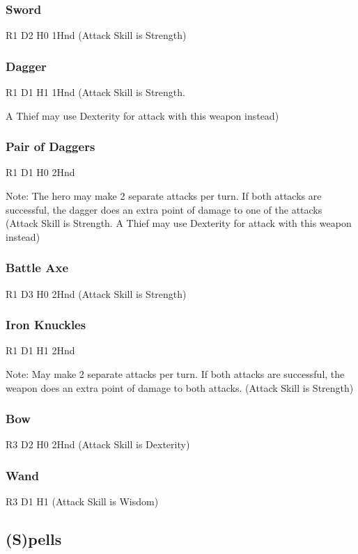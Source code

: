 \documentclass[a6paper,hidelinks]{article}
\begin{document}
\subsubsection{Sword}
R1 D2 H0 1Hnd (Attack Skill is Strength)

\subsubsection{Dagger}
R1 D1 H1 1Hnd (Attack Skill is Strength.

A Thief may use Dexterity for attack with this weapon instead)

\subsubsection{Pair of Daggers}
R1 D1 H0 2Hnd 

Note: The hero may make 2 separate attacks per turn. If both attacks are successful, the dagger does an extra point of damage to one of the attacks (Attack Skill is Strength. A Thief may use Dexterity for attack with this weapon instead)

\subsubsection{Battle Axe}
R1 D3 H0 2Hnd (Attack Skill is Strength)

\subsubsection{Iron Knuckles}
R1 D1 H1 2Hnd

Note: May make 2 separate attacks per turn. If both attacks are successful, the weapon does an extra point of damage to both attacks. (Attack Skill is Strength)

\subsubsection{Bow}
R3 D2 H0 2Hnd (Attack Skill is Dexterity)

\subsubsection{Wand}
R3 D1 H1 (Attack Skill is Wisdom)

\subsection{(S)pells}
\end{document}
